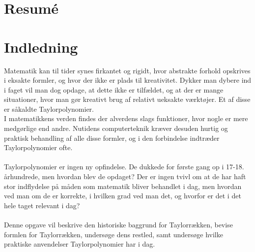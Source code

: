 \documentclass[12pt, a4paper]{article}
\begin{document}
\begin{refsection}
\section*{Resumé} %
\blindtext[1-2]
\tableofcontents
\newpage



\section{Indledning} %
Matematik kan til tider synes firkantet og rigidt, hvor abstrakte forhold opskrives i eksakte formler, og hvor der ikke er plads til kreativitet. 
Dykker man dybere ind i faget vil man dog opdage, at dette ikke er tilfældet, og at der er mange situationer, hvor man gør kreativt brug af relativt ueksakte værktøjer. Et af disse er såkaldte Taylorpolynomier.\\
I matematikkens verden findes der alverdens slags funktioner, hvor nogle er mere medgørlige end andre. Nutidens computerteknik kræver desuden hurtig og praktisk behandling af alle disse formler, og i den forbindelse indtræder Taylorpolynomier ofte.\\
\\
Taylorpolynomier er ingen ny opfindelse. De dukkede for første gang op i 17-18. århundrede, men hvordan blev de opdaget? Der er ingen tvivl om at de har haft stor indflydelse på måden som matematik bliver behandlet i dag, men hvordan ved man om de er korrekte, i hvilken grad ved man det, og hvorfor er det i det hele taget relevant i dag?\\
\\
Denne opgave vil beskrive den historiske baggrund for Taylorrækken, bevise formlen for Taylorrækken, undersøge dens restled, samt undersøge hvilke praktiske anvendelser Taylorpolynomier har i dag.


\end{refsection}
\end{document}
